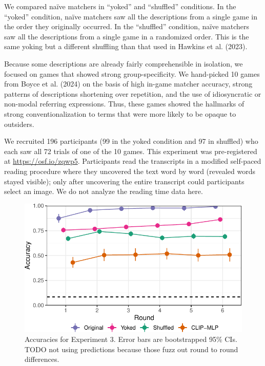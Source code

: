\documentclass[10pt, letterpaper]{article}
\begin{document}
We compared naïve matchers in ``yoked'' and ``shuffled'' conditions. In
the ``yoked'' condition, naïve matchers saw all the descriptions from a
single game in the order they originally occurred. In the ``shuffled''
condition, naïve matchers saw all the descriptions from a single game in
a randomized order. This is the same yoking but a different shuffling
than that used in Hawkins et al. (2023).

Because some descriptions are already fairly comprehensible in
isolation, we focused on games that showed strong group-specificity. We
hand-picked 10 games from Boyce et al. (2024) on the basis of high
in-game matcher accuracy, strong patterns of descriptions shortening
over repetition, and the use of idiosyncratic or non-modal referring
expressions. Thus, these games showed the hallmarks of strong
conventionalization to terms that were more likely to be opaque to
outsiders.

We recruited 196 participants (99 in the yoked condition and 97 in
shuffled) who each saw all 72 trials of one of the 10 games. This
experiment was pre-registered at \url{https://osf.io/zqwp5}.
Participants read the transcripts in a modified self-paced reading
procedure where they uncovered the text word by word (revealed words
stayed visible); only after uncovering the entire transcript could
participants select an image. We do not analyze the reading time data
here.

\begin{CodeChunk}
\begin{figure}[t]

{\centering \includegraphics[width=0.9\linewidth]{figs/fig-yoked-1} 

}

\caption[Accuracies for Experiment 3]{Accuracies for Experiment 3. Error bars are bootstrapped 95\% CIs. TODO not using predictions because those fuzz out round to round differences. \label{yoked}}\label{fig:fig-yoked}
\end{figure}
\end{CodeChunk}
\end{document}

